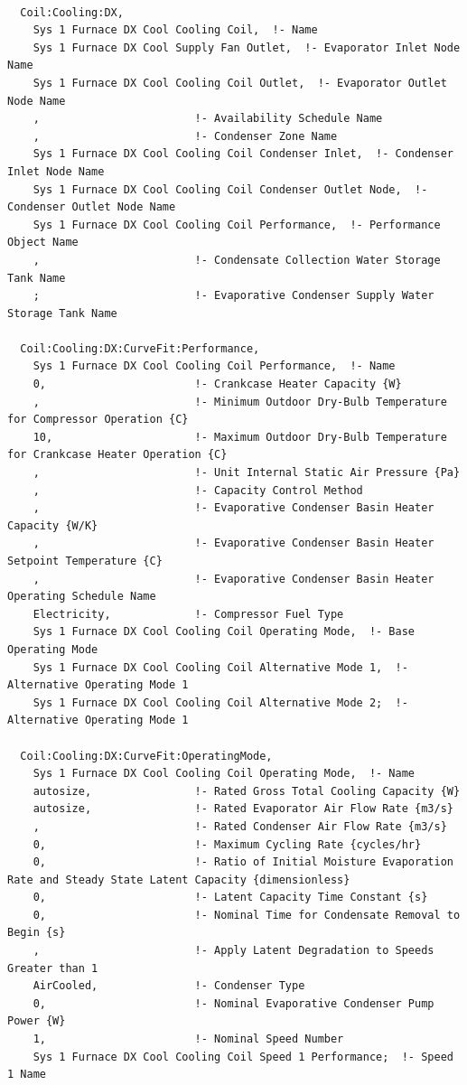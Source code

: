\begin{lstlisting}

  Coil:Cooling:DX,
    Sys 1 Furnace DX Cool Cooling Coil,  !- Name
    Sys 1 Furnace DX Cool Supply Fan Outlet,  !- Evaporator Inlet Node Name
    Sys 1 Furnace DX Cool Cooling Coil Outlet,  !- Evaporator Outlet Node Name
    ,                        !- Availability Schedule Name
    ,                        !- Condenser Zone Name
    Sys 1 Furnace DX Cool Cooling Coil Condenser Inlet,  !- Condenser Inlet Node Name
    Sys 1 Furnace DX Cool Cooling Coil Condenser Outlet Node,  !- Condenser Outlet Node Name
    Sys 1 Furnace DX Cool Cooling Coil Performance,  !- Performance Object Name
    ,                        !- Condensate Collection Water Storage Tank Name
    ;                        !- Evaporative Condenser Supply Water Storage Tank Name

  Coil:Cooling:DX:CurveFit:Performance,
    Sys 1 Furnace DX Cool Cooling Coil Performance,  !- Name
    0,                       !- Crankcase Heater Capacity {W}
    ,                        !- Minimum Outdoor Dry-Bulb Temperature for Compressor Operation {C}
    10,                      !- Maximum Outdoor Dry-Bulb Temperature for Crankcase Heater Operation {C}
    ,                        !- Unit Internal Static Air Pressure {Pa}
    ,                        !- Capacity Control Method
    ,                        !- Evaporative Condenser Basin Heater Capacity {W/K}
    ,                        !- Evaporative Condenser Basin Heater Setpoint Temperature {C}
    ,                        !- Evaporative Condenser Basin Heater Operating Schedule Name
    Electricity,             !- Compressor Fuel Type
    Sys 1 Furnace DX Cool Cooling Coil Operating Mode,  !- Base Operating Mode
    Sys 1 Furnace DX Cool Cooling Coil Alternative Mode 1,  !- Alternative Operating Mode 1
    Sys 1 Furnace DX Cool Cooling Coil Alternative Mode 2;  !- Alternative Operating Mode 1

  Coil:Cooling:DX:CurveFit:OperatingMode,
    Sys 1 Furnace DX Cool Cooling Coil Operating Mode,  !- Name
    autosize,                !- Rated Gross Total Cooling Capacity {W}
    autosize,                !- Rated Evaporator Air Flow Rate {m3/s}
    ,                        !- Rated Condenser Air Flow Rate {m3/s}
    0,                       !- Maximum Cycling Rate {cycles/hr}
    0,                       !- Ratio of Initial Moisture Evaporation Rate and Steady State Latent Capacity {dimensionless}
    0,                       !- Latent Capacity Time Constant {s}
    0,                       !- Nominal Time for Condensate Removal to Begin {s}
    ,                        !- Apply Latent Degradation to Speeds Greater than 1
    AirCooled,               !- Condenser Type
    0,                       !- Nominal Evaporative Condenser Pump Power {W}
    1,                       !- Nominal Speed Number
    Sys 1 Furnace DX Cool Cooling Coil Speed 1 Performance;  !- Speed 1 Name


\end{lstlisting}

